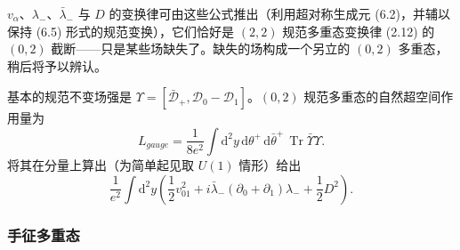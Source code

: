 

$v_\alpha$、$\lambda_-$、$\bar\lambda_-$ 与 $D$ 的变换律可由这些公式推出（利用超对称生成元 (6.2)，并辅以保持 (6.5) 形式的规范变换），它们恰好是 $(2,2)$ 规范多重态变换律 (2.12) 的 $(0,2)$ 截断——只是某些场缺失了。缺失的场构成一个另立的 $(0,2)$ 多重态，稍后将予以辨认。


基本的规范不变场强是 $\Upsilon=[\bar{\mathcal{D}}_+,\mathcal{D}_0-\mathcal{D}_1]$。$(0,2)$ 规范多重态的自然超空间作用量为
\begin{equation} L_{gauge}=\frac{1}{8e^2}\int\mathrm{d}^2y\,\mathrm{d}\theta^+\,\mathrm{d}\bar\theta^+\,\operatorname{Tr}\bar\Upsilon\Upsilon.\tag{6.8}
\end{equation}
将其在分量上算出（为简单起见取 $U(1)$ 情形）给出
\begin{equation} \frac{1}{e^2}\int\mathrm{d}^2y\left(\frac{1}{2}v_{01}^2+i\bar\lambda_-(\partial_0+\partial_1)\lambda_-+\frac{1}{2}D^2\right).\tag{6.9}
\end{equation}


\subsubsection*{手征多重态}

